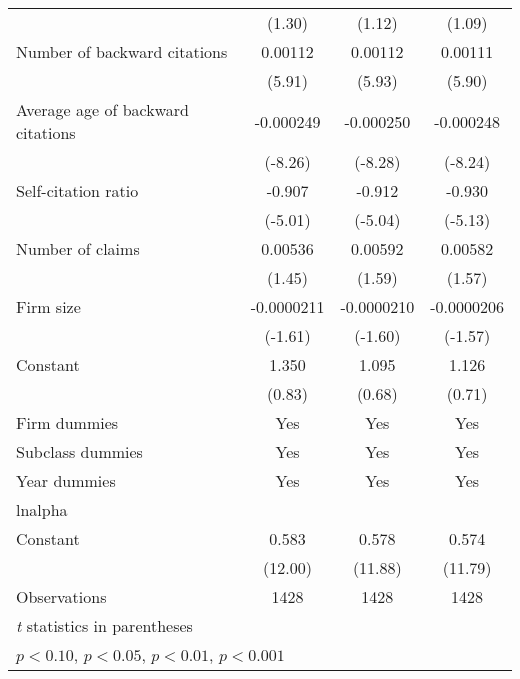 \begin{table}[htbp]
\begin{tabular}{l*{3}{c}}
                    &      (1.30)         &      (1.12)         &      (1.09)         \\
\addlinespace
Number of backward citations&     0.00112\sym{***}&     0.00112\sym{***}&     0.00111\sym{***}\\
                    &      (5.91)         &      (5.93)         &      (5.90)         \\
\addlinespace
Average age of backward citations&   -0.000249\sym{***}&   -0.000250\sym{***}&   -0.000248\sym{***}\\
                    &     (-8.26)         &     (-8.28)         &     (-8.24)         \\
\addlinespace
Self-citation ratio &      -0.907\sym{***}&      -0.912\sym{***}&      -0.930\sym{***}\\
                    &     (-5.01)         &     (-5.04)         &     (-5.13)         \\
\addlinespace
Number of claims    &     0.00536         &     0.00592         &     0.00582         \\
                    &      (1.45)         &      (1.59)         &      (1.57)         \\
\addlinespace
Firm size           &  -0.0000211         &  -0.0000210         &  -0.0000206         \\
                    &     (-1.61)         &     (-1.60)         &     (-1.57)         \\
\addlinespace
Constant            &       1.350         &       1.095         &       1.126         \\
                    &      (0.83)         &      (0.68)         &      (0.71)         \\
\addlinespace
Firm dummies&Yes&Yes&Yes\\
\addlinespace
Subclass dummies&Yes&Yes&Yes\\
\addlinespace
Year dummies&Yes&Yes&Yes\\
\midrule
lnalpha             &                     &                     &                     \\
Constant            &       0.583\sym{***}&       0.578\sym{***}&       0.574\sym{***}\\
                    &     (12.00)         &     (11.88)         &     (11.79)         \\
\midrule
Observations        &        1428         &        1428         &        1428         \\
\bottomrule
\multicolumn{4}{l}{\footnotesize \textit{t} statistics in parentheses}\\
\multicolumn{4}{l}{\footnotesize \sym{+} \(p<0.10\), \sym{*} \(p<0.05\), \sym{**} \(p<0.01\), \sym{***} \(p<0.001\)}\\
\end{tabular}
\end{table}
